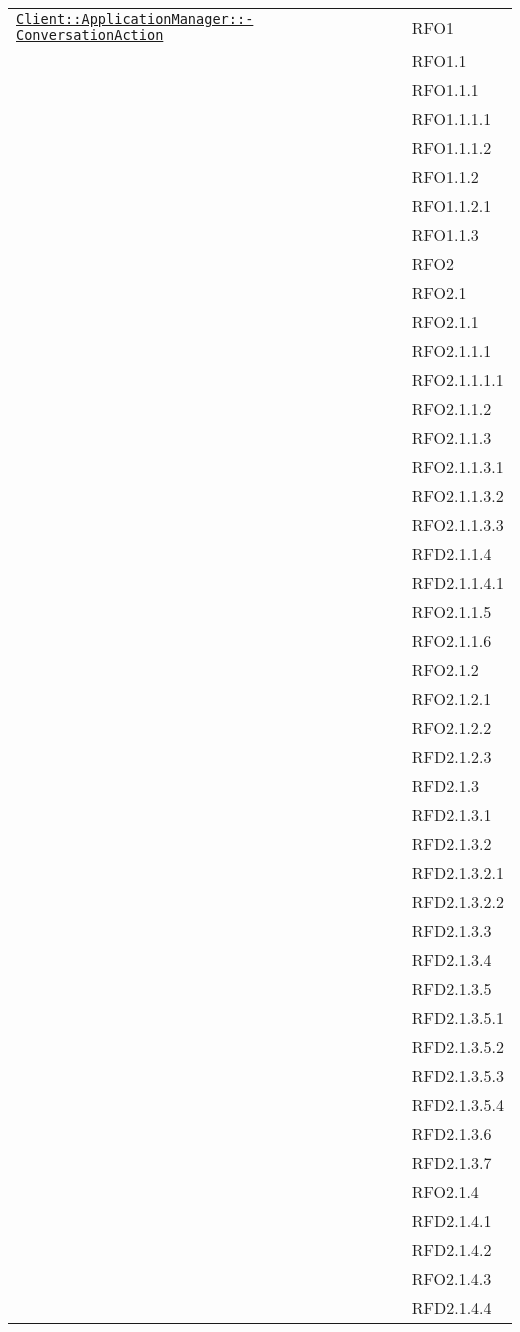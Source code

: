 \begin{longtable}{|>{\centering}m{10cm}|m{3cm}<{\centering}|}
\hyperref[Client::ApplicationManager::ConversationAction]{\texttt{Client::ApplicationManager::-\linebreak ConversationAction}} & RFO1\\
& RFO1.1\\
& RFO1.1.1\\
& RFO1.1.1.1\\
& RFO1.1.1.2\\
& RFO1.1.2\\
& RFO1.1.2.1\\
& RFO1.1.3\\
& RFO2\\
& RFO2.1\\
& RFO2.1.1\\
& RFO2.1.1.1\\
& RFO2.1.1.1.1\\
& RFO2.1.1.2\\
& RFO2.1.1.3\\
& RFO2.1.1.3.1\\
& RFO2.1.1.3.2\\
& RFO2.1.1.3.3\\
& RFD2.1.1.4\\
& RFD2.1.1.4.1\\
& RFO2.1.1.5\\
& RFO2.1.1.6\\
& RFO2.1.2\\
& RFO2.1.2.1\\
& RFO2.1.2.2\\
& RFD2.1.2.3\\
& RFD2.1.3\\
& RFD2.1.3.1\\
& RFD2.1.3.2\\
& RFD2.1.3.2.1\\
& RFD2.1.3.2.2\\
& RFD2.1.3.3\\
& RFD2.1.3.4\\
& RFD2.1.3.5\\
& RFD2.1.3.5.1\\
& RFD2.1.3.5.2\\
& RFD2.1.3.5.3\\
& RFD2.1.3.5.4\\
& RFD2.1.3.6\\
& RFD2.1.3.7\\
& RFO2.1.4\\
& RFD2.1.4.1\\
& RFD2.1.4.2\\
& RFO2.1.4.3\\
& RFD2.1.4.4\\

\end{longtable}
